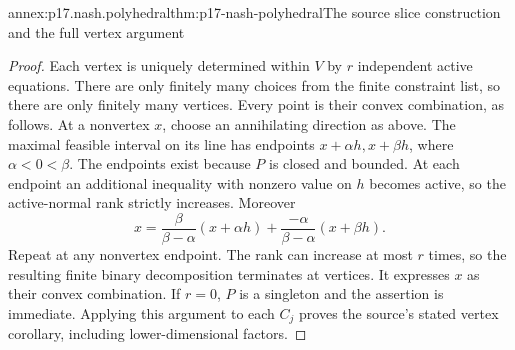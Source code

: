 \begin{annexitem}{annex:p17.nash.polyhedral}{thm:p17-nash-polyhedral}{The source slice construction and the full vertex argument}
\begin{proof}
Each vertex is uniquely determined within
\(V\) by \(r\) independent active equations.
There are only finitely many choices from
the finite constraint list, so there are
only finitely many vertices.
Every point is their convex combination,
as follows. At a nonvertex \(x\), choose
an annihilating direction as above.
The maximal feasible interval on its line
has endpoints \(x+\alpha h,x+\beta h\),
where \(\alpha<0<\beta\). The endpoints
exist because \(P\) is closed and bounded.
At each endpoint an additional inequality
with nonzero value on \(h\) becomes active,
so the active-normal rank strictly increases.
Moreover
\[
 x=\frac{\beta}{\beta-\alpha}(x+\alpha h)
                      +\frac{-\alpha}{\beta-\alpha}(x+\beta h).
\]
Repeat at any nonvertex endpoint. The
rank can increase at most \(r\) times,
so the resulting finite binary decomposition
terminates at vertices. It expresses \(x\)
as their convex combination.
If \(r=0\), \(P\) is a singleton and
the assertion is immediate.
Applying this argument to each \(C_j\)
proves the source's stated vertex corollary,
including lower-dimensional factors.
\end{proof}
\end{annexitem}

